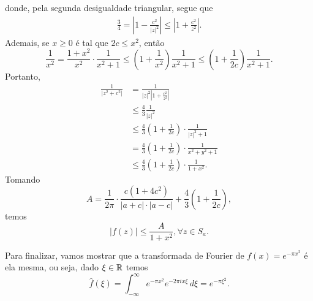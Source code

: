 \begin{exemplo}
\begin{equation*}
            \end{equation*}
            donde, pela segunda desigualdade triangular, segue que
            \begin{align*}
                \frac{3}{4} = \left|1 - \frac{c^2}{|z|^2}\right| \leq \left|1 + \frac{c^2}{z^2}\right|.
            \end{align*}
            Ademais, se $x\geq 0$ é tal que $2c \leq x^2$, então
            \begin{equation*}
                \frac{1}{x^2} = \frac{1+x^2}{x^2}\cdot\frac{1}{x^2+1}
                              \leq \left( 1+\frac{1}{x^2} \right)\frac{1}{x^2+1}
                              \leq \left( 1+\frac{1}{2c} \right)\frac{1}{x^2+1}.
            \end{equation*} 
            Portanto,
            \begin{align*}
                \frac{1}{|z^2+c^2|} &= \frac{1}{|z|^2\left|1+\frac{c^2}{z^2}\right|} \\
                                    &\leq \frac{4}{3}\frac{1}{|z|^2} \\
                                    &\leq \frac{4}{3}\left(1+\frac{1}{2c}\right)\cdot\frac{1}{|z|^2+1} \\
                                    &= \frac{4}{3}\left(1+\frac{1}{2c}\right)\cdot\frac{1}{x^2+y^2+1} \\
                                    &\leq \frac{4}{3}\left(1+\frac{1}{2c}\right)\cdot\frac{1}{1+x^2}.
            \end{align*}
            Tomando
            \begin{equation*}
                A =\frac{1}{2\pi}\cdot\frac{c(1+4c^2)}{|a+c|\cdot|a-c|}
                +\frac{4}{3}\left(1+\frac{1}{2c}\right),
            \end{equation*}
            temos
            \begin{equation*}
                |f(z)| \leq \frac{A}{1+ x^2}, \forall z\in S_a.
            \end{equation*}
        \end{exemplo}
        Para finalizar, vamos mostrar que a transformada de Fourier de $f(x) = e^{-\pi x^2}$ é
        ela mesma, ou seja, dado $\xi\in\mathbb{R}$ temos
        \begin{equation*}
            \widehat{f}(\xi) = \int_{-\infty}^{\infty} e^{-\pi x^2}e^{-2\pi ix\xi} \, d\xi 
                             = e^{-\pi \xi^2}.
        \end{equation*}
